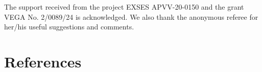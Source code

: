 \documentclass[12pt]{iopart}
\theoremstyle{definition}
\begin{document}
%
%

\ack
The support received from the project EXSES APVV-20-0150 and the grant VEGA
No. 2/0089/24 is acknowledged. We also thank the anonymous referee for her/his useful suggestions and comments.

\section*{References}
\end{document}
